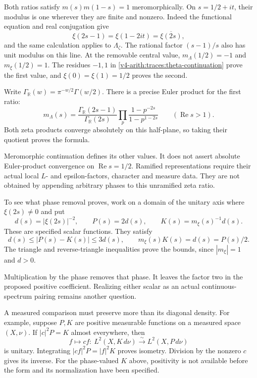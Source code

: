 Both ratios satisfy $m(s)m(1-s)=1$ meromorphically. On $s=1/2+it$, their
modulus is one wherever they are finite and nonzero. Indeed the functional
equation and real conjugation give
\[
 \xi(2s-1)=\xi(1-2it)
          =\overline{\xi(2s)},
\]
and the same calculation applies to $\Lambda_\zeta$. The rational factor
$(s-1)/s$ also has unit modulus on this line. At the removable central
value, $m_\Lambda(1/2)=-1$ and $m_\xi(1/2)=1$. The residues $-1,1$ in
\eqref{v4-arith:traces:theta-continuation} prove the first value, and
$\xi(0)=\xi(1)=1/2$ proves the second.

Write $\Gamma_{\mathbb R}(w)=\pi^{-w/2}\Gamma(w/2)$. There is a precise
Euler product for the first ratio:
\[
 m_\Lambda(s)
   =\frac{\Gamma_{\mathbb R}(2s-1)}{\Gamma_{\mathbb R}(2s)}
      \prod_p\frac{1-p^{-2s}}{1-p^{1-2s}}
          \qquad(\operatorname{Re}s>1).
\]
Both zeta products converge absolutely on this half-plane, so taking their
quotient proves the formula.

Meromorphic continuation defines its other values. It does not assert
absolute Euler-product convergence on $\operatorname{Re}s=1/2$. Ramified
representations require their actual local $L$- and epsilon-factors,
character and measure data. They are not obtained by appending arbitrary
phases to this unramified zeta ratio.

To see what phase removal proves, work on a domain of the unitary axis where
$\xi(2s)\ne0$ and put
\[
 d(s)=|\xi(2s)|^{-2},\qquad
 P(s)=2d(s),\qquad K(s)=m_\xi(s)^{-1}d(s).
\]
These are specified scalar functions. They satisfy
\begin{equation}
\label{v4-arith:traces:phase-density}
 d(s)\leq|P(s)-K(s)|\leq3d(s),\qquad
 m_\xi(s)K(s)=d(s)=P(s)/2.
\end{equation}
The triangle and reverse-triangle inequalities prove the bounds, since
$|m_\xi|=1$ and $d>0$.

Multiplication by the phase removes that phase. It leaves the factor two in
the proposed positive coefficient. Realizing either scalar as an actual
continuous-spectrum pairing remains another question.

A measured comparison must preserve more than its diagonal density. For
example, suppose $P,K$ are positive measurable functions on a measured space
$(X,\nu)$. If $|c|^2P=K$ almost everywhere, then
\[
 f\longmapsto cf:\ L^2(X,K\,d\nu)
       \xrightarrow{\sim}L^2(X,P\,d\nu)
\]
is unitary. Integrating $|cf|^2P=|f|^2K$ proves isometry. Division by the
nonzero $c$ gives its inverse. For the phase-valued $K$ above, positivity is
not available before the form and its normalization have been specified.

